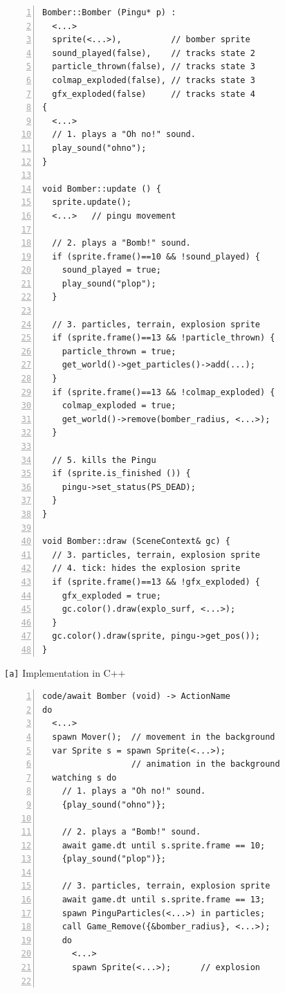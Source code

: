 \documentclass{vgtc}                          %
\newcommand{\code}[1] {{\small{\texttt{#1}}}}
\newcommand{\ax}{\code{[a]}\xspace}
\begin{document}
\begin{figure}[th!]
\begin{minipage}[t]{0.50\linewidth}
\begin{lstlisting}[numbers=left,xleftmargin=3em]
Bomber::Bomber (Pingu* p) :
  <...>
  sprite(<...>),          // bomber sprite
  sound_played(false),    // tracks state 2
  particle_thrown(false), // tracks state 3
  colmap_exploded(false), // tracks state 3
  gfx_exploded(false)     // tracks state 4
{
  <...>
  // 1. plays a "Oh no!" sound.
  play_sound("ohno");
}

void Bomber::update () {
  sprite.update();
  <...>   // pingu movement

  // 2. plays a "Bomb!" sound.
  if (sprite.frame()==10 && !sound_played) {
    sound_played = true;
    play_sound("plop");
  }

  // 3. particles, terrain, explosion sprite
  if (sprite.frame()==13 && !particle_thrown) {
    particle_thrown = true;
    get_world()->get_particles()->add(...);
  }
  if (sprite.frame()==13 && !colmap_exploded) {
    colmap_exploded = true;
    get_world()->remove(bomber_radius, <...>);
  }

  // 5. kills the Pingu
  if (sprite.is_finished ()) {
    pingu->set_status(PS_DEAD);
  }
}

void Bomber::draw (SceneContext& gc) {
  // 3. particles, terrain, explosion sprite
  // 4. tick: hides the explosion sprite
  if (sprite.frame()==13 && !gfx_exploded) {
    gfx_exploded = true;
    gc.color().draw(explo_surf, <...>);
  }
  gc.color().draw(sprite, pingu->get_pos());
}
\end{lstlisting}
\centering\small{\ax Implementation in C++}
\end{minipage}
%
\begin{minipage}[t]{0.50\linewidth}
\begin{lstlisting}[numbers=left,xleftmargin=3em]
code/await Bomber (void) -> ActionName
do
  <...>
  spawn Mover();  // movement in the background
  var Sprite s = spawn Sprite(<...>);
                  // animation in the background
  watching s do
    // 1. plays a "Oh no!" sound.
    {play_sound("ohno")};

    // 2. plays a "Bomb!" sound.
    await game.dt until s.sprite.frame == 10;
    {play_sound("plop")};

    // 3. particles, terrain, explosion sprite
    await game.dt until s.sprite.frame == 13;
    spawn PinguParticles(<...>) in particles;
    call Game_Remove({&bomber_radius}, <...>);
    do
      <...>
      spawn Sprite(<...>);      // explosion


\end{lstlisting}
\end{minipage}
\end{figure}
\end{document}
